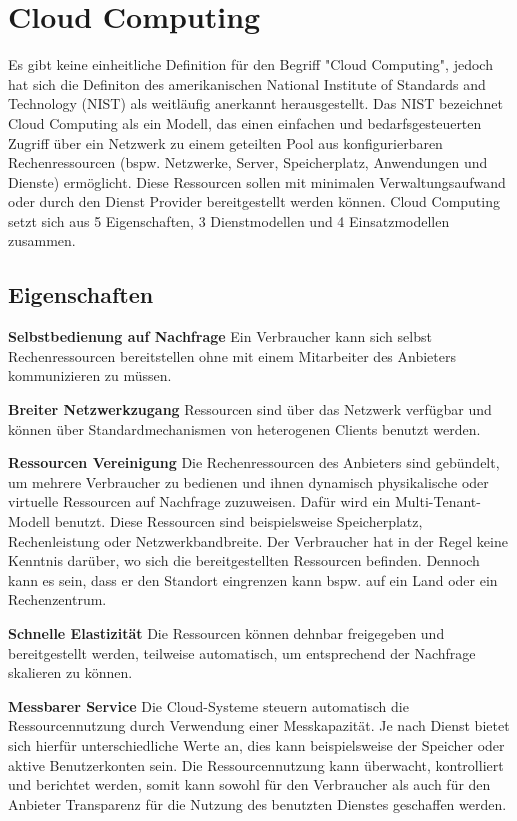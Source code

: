 \section{Cloud Computing}
Es gibt keine einheitliche Definition für den Begriff "Cloud Computing", jedoch hat sich die Definiton des amerikanischen National Institute of Standards and Technology (NIST) als weitläufig anerkannt herausgestellt. Das NIST bezeichnet Cloud Computing als ein Modell, das einen einfachen und bedarfsgesteuerten Zugriff über ein Netzwerk zu einem geteilten Pool aus konfigurierbaren Rechenressourcen (bspw. Netzwerke, Server, Speicherplatz, Anwendungen und Dienste) ermöglicht. Diese Ressourcen sollen mit minimalen Verwaltungsaufwand oder durch den Dienst Provider bereitgestellt werden können. Cloud Computing setzt sich aus 5 Eigenschaften, 3 Dienstmodellen und 4 Einsatzmodellen zusammen.

\subsection{Eigenschaften} 

\textbf{Selbstbedienung auf Nachfrage} \hfill 
Ein Verbraucher kann sich selbst Rechenressourcen bereitstellen ohne mit einem Mitarbeiter des Anbieters kommunizieren zu müssen.

\textbf{Breiter Netzwerkzugang} \hfill
Ressourcen sind über das Netzwerk verfügbar und können über Standardmechanismen von heterogenen Clients benutzt werden.

\textbf{Ressourcen Vereinigung} \hfill
Die Rechenressourcen des Anbieters sind gebündelt, um mehrere Verbraucher zu bedienen und ihnen dynamisch physikalische oder virtuelle Ressourcen auf Nachfrage zuzuweisen. Dafür wird ein Multi-Tenant-Modell benutzt. Diese Ressourcen sind beispielsweise Speicherplatz, Rechenleistung oder Netzwerkbandbreite. Der Verbraucher hat in der Regel keine Kenntnis darüber, wo sich die bereitgestellten Ressourcen befinden. Dennoch kann es sein, dass er den Standort eingrenzen kann bspw. auf ein Land oder ein Rechenzentrum.

\textbf{Schnelle Elastizität} \hfill
Die Ressourcen können dehnbar freigegeben und bereitgestellt werden, teilweise automatisch, um entsprechend der Nachfrage skalieren zu können.

\textbf{Messbarer Service} \hfill
Die Cloud-Systeme steuern automatisch die Ressourcennutzung durch Verwendung einer Messkapazität. Je nach Dienst bietet sich hierfür unterschiedliche Werte an, dies kann beispielsweise der Speicher oder aktive Benutzerkonten sein. Die Ressourcennutzung kann überwacht, kontrolliert und berichtet werden, somit kann sowohl für den Verbraucher als auch für den Anbieter Transparenz für die Nutzung des benutzten Dienstes geschaffen werden.


